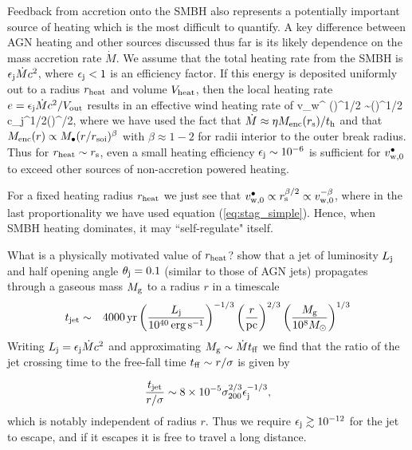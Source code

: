\documentclass[usenatbib,fleqn]{mn2e}
\begin{document}
Feedback from accretion onto the SMBH also represents a potentially important source of heating which is the most difficult to quantify.  A key difference between AGN heating and other sources discussed thus far is its likely dependence on the mass accretion rate $\dot{M}$.  We assume that the total heating rate from the SMBH is $\epsilon_{\rm j} \dot{M}c^{2}$, where $\epsilon_{\rm j} < 1$ is an efficiency factor.  If this energy is deposited uniformly out to a radius $r_{\rm heat}$ and volume $V_{\rm heat}$, then the local heating rate $e = \epsilon_{\rm j}\dot{M}c^{2}/V_{\rm out}$ results in an effective wind heating rate of
\be
v_w^{\bullet} \approx  \left(\right)^{1/2} \sim \left(\right)^{1/2} \approx c\epsilon_{\rm j}^{1/2}\left(\right)^{\beta/2},
\ee
where we have used the fact that $\dot{M} \approx \eta M_{\rm enc}(r_{\rm s})/t_{\rm h}$ and that $M_{\rm enc}(r) \propto M_{\bullet}(r/r_{\rm soi})^{\beta}$ with $\beta \approx 1-2$ for radii interior to the outer break radius.  Thus for $r_{\rm heat} \sim r_{\rm s}$, even a small heating efficiency $\epsilon_{\rm j} \sim 10^{-6}$ is sufficient for $v_{\rm w,0}^{\bullet}$ to exceed other sources of non-accretion powered heating.  

For a fixed heating radius $r_{\rm heat}$ we just see that $v_{\rm
  w,0}^{\bullet} \propto r_{\rm s}^{\beta/2} \propto v_{\rm
  w,0}^{-\beta}$, where in the last proportionality we have used
equation (\ref{eq:stag_simple}).  Hence, when SMBH heating dominates,
it may ``self-regulate" itself.

What is a physically motivated value of $r_{\rm heat}$?
\citet{Bromberg+11} show that a jet of luminosity $L_{\rm j}$ and half
opening angle $\theta_{\rm j} = 0.1$ (similar to those of AGN jets)
propagates through a gaseous mass $M_{\rm g}$ to a radius $r$ in a
timescale
\begin{eqnarray}
t_{\rm jet} &\sim& 4000\,{\rm yr}\left(\frac{{L}_{\rm j}}{10^{40}\,\rm erg\,s^{-1}}\right)^{-1/3}\left(\frac{r}{\rm pc}\right)^{2/3}\left(\frac{M_{\rm g}}{10^{8}M_{\odot}}\right)^{1/3} 
\end{eqnarray}
Writing $L_{\rm j} = \epsilon_{\rm j}\dot{M}c^{2}$ and approximating $M_{\rm g} \sim \dot{M}t_{\rm ff}$ we find that the ratio of the jet crossing time to the free-fall time $t_{\rm ff} \sim r/\sigma$ is given by

\begin{equation}
\frac{t_{\rm jet}}{r/\sigma} \sim 8\times 10^{-5}\sigma_{200}^{2/3}\epsilon_{\rm j}^{-1/3},
\end{equation}
which is notably independent of radius $r$.  Thus we require $\epsilon_{\rm j} \gtrsim 10^{-12}$ for the jet to escape, and if it escapes it is free to travel a long distance. 
\end{document}
